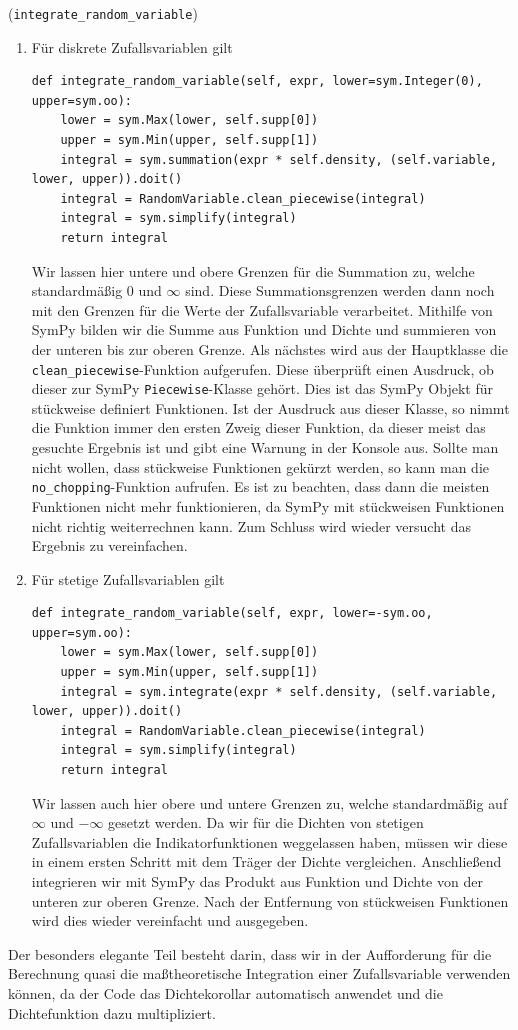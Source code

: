 \begin{Code}{(\lstinline|integrate_random_variable|)}
\begin{enumerate}[label=(\roman*)]
\item Für diskrete Zufallsvariablen gilt
\begin{lstlisting}
def integrate_random_variable(self, expr, lower=sym.Integer(0), upper=sym.oo):
    lower = sym.Max(lower, self.supp[0])
    upper = sym.Min(upper, self.supp[1])
    integral = sym.summation(expr * self.density, (self.variable, lower, upper)).doit()
    integral = RandomVariable.clean_piecewise(integral)
    integral = sym.simplify(integral)
    return integral
\end{lstlisting}
Wir lassen hier untere und obere Grenzen für die Summation zu, welche standardmäßig $0$ und $\infty$ sind. Diese Summationsgrenzen werden dann noch mit den Grenzen für die Werte der Zufallsvariable verarbeitet. Mithilfe von SymPy bilden wir die Summe aus Funktion und Dichte  und summieren von der unteren bis zur oberen Grenze. Als nächstes wird aus der Hauptklasse die \lstinline|clean_piecewise|-Funktion aufgerufen. Diese überprüft einen Ausdruck, ob dieser zur SymPy \lstinline|Piecewise|-Klasse gehört. Dies ist das SymPy Objekt für stückweise definiert Funktionen. Ist der Ausdruck aus dieser Klasse, so nimmt die Funktion immer den ersten Zweig dieser Funktion, da dieser meist das gesuchte Ergebnis ist und gibt eine Warnung in der Konsole aus. Sollte man nicht wollen, dass stückweise Funktionen gekürzt werden, so kann man die \lstinline|no_chopping|-Funktion aufrufen. Es ist zu beachten, dass dann die meisten Funktionen nicht mehr funktionieren, da SymPy mit stückweisen Funktionen nicht richtig weiterrechnen kann. Zum Schluss wird wieder versucht das Ergebnis zu vereinfachen.

\item Für stetige Zufallsvariablen gilt
\begin{lstlisting}
def integrate_random_variable(self, expr, lower=-sym.oo, upper=sym.oo):
    lower = sym.Max(lower, self.supp[0])
    upper = sym.Min(upper, self.supp[1])
    integral = sym.integrate(expr * self.density, (self.variable, lower, upper)).doit()
    integral = RandomVariable.clean_piecewise(integral)
    integral = sym.simplify(integral)
    return integral
\end{lstlisting}
Wir lassen auch hier obere und untere Grenzen zu, welche standardmäßig auf $\infty$ und $- \infty$ gesetzt werden. Da wir für die Dichten von stetigen Zufallsvariablen die Indikatorfunktionen weggelassen haben, müssen wir diese in einem ersten Schritt mit dem Träger der Dichte vergleichen. Anschließend integrieren wir mit SymPy das Produkt aus Funktion und Dichte von der unteren zur oberen Grenze. Nach der Entfernung von stückweisen Funktionen wird dies wieder vereinfacht und ausgegeben.
\end{enumerate}

Der besonders elegante Teil besteht darin, dass wir in der Aufforderung für die Berechnung quasi die maßtheoretische Integration einer Zufallsvariable verwenden können, da der Code das Dichtekorollar automatisch anwendet und die Dichtefunktion dazu multipliziert.
\end{Code}

